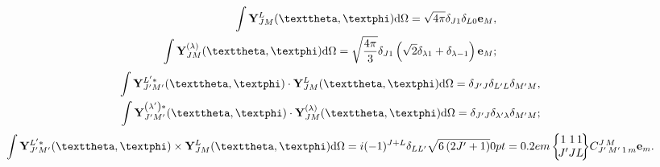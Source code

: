 \begin{equation}
\begin{aligned}\int \vect{Y}_{J M}^{L}(\vartheta, \varphi) \dd \Omega=\sqrt{4 \pi} \delta_{J 1} \delta_{L 0} \vect{e}_{M},  \\
\int \vect{Y}_{J M}^{(\lambda)}(\vartheta, \varphi) \dd \Omega=\sqrt{\frac{4 \pi}{3}} \delta_{J 1}\left(\sqrt{2} \delta_{\lambda 1}+\delta_{\lambda-1}\right) \vect{e}_{M} ; 
\end{aligned} \label{eq:7:3:118}
\end{equation}
\begin{equation}
\begin{aligned}
\int \vect{Y}_{J^{\prime} M^{\prime}}^{L^{\prime} *}(\vartheta, \varphi) \cdot \vect{Y}_{J M}^{L}(\vartheta, \varphi) \dd \Omega=\delta_{J^{\prime} J} \delta_{L^{\prime} L} \delta_{M^{\prime} M} ,\\
\int \vect{Y}_{J^{\prime} M^{\prime}}^{\left(\lambda^{\prime}\right) *}(\vartheta, \varphi) \cdot \vect{Y}_{J M}^{(\lambda)}(\vartheta, \varphi) \dd \Omega=\delta_{J^{\prime} J} \delta_{\lambda^{\prime} \lambda} \delta_{M^{\prime} M} ;   \label{eq:7:3:119}
\end{aligned}
\end{equation}
\begin{gather}
\int \vect{Y}_{J^{\prime} M^{\prime}}^{L^{\prime} *}(\vartheta, \varphi) \times \vect{Y}_{J M}^{L}(\vartheta, \varphi) \dd \Omega=i(-1)^{J+L} \delta_{L L^{\prime}} \sqrt{6\left(2 J^{\prime}+1\right)}\sixj{1}{1}{1}{J^{\prime}}{J}{L} \clebsch{J^{\prime}}{M^{\prime}}{1}{m}{J}{M} \vect{e}_{m} . \label{eq:7:3:120}
\end{gather}
